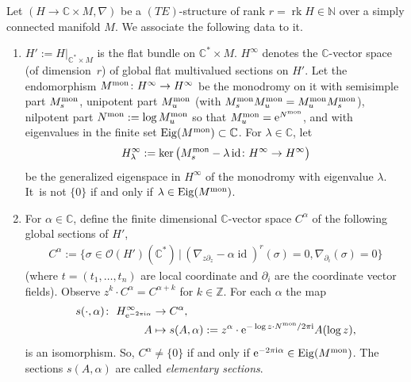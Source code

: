 \documentclass[10pt,a4paper]{amsart}
\numberwithin{equation}{section}
\numberwithin{figure}{section}
\newcommand{\N}{{\mathbb N}}
\newcommand{\Z}{{\mathbb Z}}
\newcommand{\C}{{\mathbb C}}
\newcommand{\OO}{{\mathcal O}}
\newcommand{\paa}{\partial}
\newcommand{\nnn}{\nabla}
\DeclareMathOperator{\Eig}{Eig}
\DeclareMathOperator{\id}{id}
\DeclareMathOperator{\rk}{rk}
\begin{document}
\begin{Definition}\label{t3.21}
Let $(H\to \C\times M,\nnn)$ be a $(TE)$-structure
of rank $r=\rk H\in\N$ over a simply connected manifold $M$.
We associate the following data to it.
\begin{enumerate}\itemsep=0pt
\item[$(a)$] $H':=H|_{\C^*\times M}$ is the flat bundle on
$\C^*\times M$.
$H^\infty$ denotes the $\C$-vector space (of dimen\-sion~$r$)
of global flat multivalued sections on $H'$.
Let the endomorphism $M^{\rm mon}\colon H^\infty\to H^\infty$
be the monodromy on it with semisimple part
$M^{\rm mon}_s$, unipotent part $M^{\rm mon}_u$
(with $M^{\rm mon}_sM^{\rm mon}_u=M^{\rm mon}_uM^{\rm mon}_s$),
nilpotent part $N^{\rm mon}:=\log M^{\rm mon}_u$
so that $M^{\rm mon}_u={\rm e}^{N^{\rm mon}}$,
and with eigenvalues in the finite set
$\Eig(M^{\rm mon})\subset\C$. For $\lambda\in\C$, let
\begin{gather*}
H^\infty_\lambda:=\ker\big(M^{\rm mon}_s-\lambda\id\colon H^\infty\to
H^\infty\big)
\end{gather*}
be the generalized eigenspace in $H^\infty$
of the monodromy with eigenvalue $\lambda$. It~is not $\{0\}$ if and only if $\lambda\in\Eig(M^{\rm mon})$.

\item[$(b)$] For $\alpha\in\C$, define the finite dimensional
$\C$-vector space $C^\alpha$
of the following global sections of $H'$,
\begin{gather*}%
C^\alpha:= \big\{\sigma\in\OO(H')(\C^*)\,|\, (\nnn_{z\paa_z}-\alpha\id)^r(\sigma)=0,
\nnn_{\paa_i}(\sigma)=0\big\}
\end{gather*}
(where $t=(t_1,\dots ,t_n)$ are local coordinate and
$\paa_i$ are the coordinate vector fields).
Observe $z^k\cdot C^\alpha =C^{\alpha+k}$ for $k\in\Z$.
For each $\alpha$ the map
\begin{align*}
s(\cdot,\alpha)\colon\ H^\infty_{{\rm e}^{-2\pi {\rm i}\alpha}}&\to C^\alpha,
\\
A&\mapsto s(A,\alpha):=z^\alpha\cdot
{\rm e}^{-\log z\cdot N^{\rm mon}/2\pi {\rm i}}A(\log z),
\end{align*}
is an isomorphism. So, $C^\alpha\neq\{0\}$ if and only if
${\rm e}^{-2\pi {\rm i}\alpha}\in\Eig(M^{\rm mon})$.
The sections $s(A,\alpha)$ are called
{\it elementary sections}.


\end{enumerate}
\end{Definition}
\end{document}
